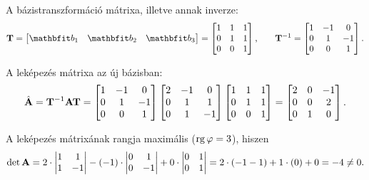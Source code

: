 \documentclass{szb-solution}
\begin{document}
A bázistranszformáció mátrixa, illetve annak inverze:
$$
  \rmat T = \begin{bmatrix}
    \rvec b_1 & \rvec b_2 & \rvec b_3
  \end{bmatrix} = \begin{bmatrix}
    1 & 1 & 1 \\
    0 & 1 & 1 \\
    0 & 0 & 1
  \end{bmatrix}
  \text,\qquad
  \rmat T^{-1} = \begin{bmatrix}
    1 & -1 & 0  \\
    0 & 1  & -1 \\
    0 & 0  & 1
  \end{bmatrix}
  \text.
$$

A leképezés mátrixa az új bázisban:
$$
  \hat{\mathbf{A}} = \mathbf{T}^{-1} \mathbf{A} \mathbf{T}
  = \begin{bmatrix}
    1 & -1 & 0  \\
    0 & 1  & -1 \\
    0 & 0  & 1
  \end{bmatrix} \begin{bmatrix}
    2 & -1 & 0  \\
    0 & 1  & 1  \\
    0 & 1  & -1
  \end{bmatrix} \begin{bmatrix}
    1 & 1 & 1 \\
    0 & 1 & 1 \\
    0 & 0 & 1
  \end{bmatrix} = \begin{bmatrix}
    2 & 0 & -1 \\
    0 & 0 & 2  \\
    0 & 1 & 0
  \end{bmatrix}
  \text.
$$

A leképezés mátrixának rangja maximális ($\operatorname{rg} \varphi = 3$), hiszen
$$
  \det \mathbf{A} = 2 \cdot \begin{vmatrix}
    1 & 1  \\
    1 & -1
  \end{vmatrix} - (-1) \cdot \begin{vmatrix}
    0 & 1  \\
    0 & -1
  \end{vmatrix} + 0 \cdot \begin{vmatrix}
    0 & 1 \\
    0 & 1
  \end{vmatrix} = 2 \cdot (-1 -1) + 1 \cdot (0) + 0 = -4 \neq 0
  \text.
$$
\end{document}
